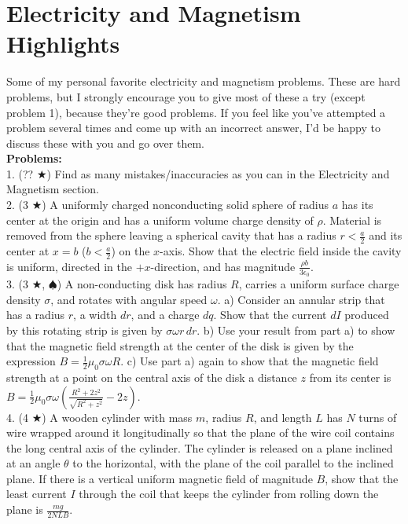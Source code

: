 \section*{Electricity and Magnetism Highlights}
Some of my personal favorite electricity and magnetism problems. These are hard problems, but I strongly encourage you to give most of these a try (except problem 1), because they're good problems. If you feel like you've attempted a problem several times and come up with an incorrect answer, I'd be happy to discuss these with you and go over them.\\
\textbf{Problems:}\\
1. (?? $\bigstar$) Find as many mistakes/inaccuracies as you can in the Electricity and Magnetism section. \\
2. (3 $\bigstar$) A uniformly charged nonconducting solid sphere of radius $a$ has its center at the origin and has a uniform volume charge density of $\rho$. Material is removed from the sphere leaving a spherical cavity that has a radius $r < \frac{a}{2}$ and its center at $x=b$ ($b< \frac{a}{2}$) on the $x$-axis. Show that the electric field inside the cavity is uniform, directed in the $+x$-direction, and has magnitude $\frac{\rho b}{3\epsilon_0}$. \\
3. (3 $\bigstar$, $\spadesuit$) A non-conducting disk has radius $R$, carries a uniform surface charge density $\sigma$, and rotates with angular speed $\omega$. a) Consider an annular strip that has a radius $r$, a width $dr$, and a charge $dq$. Show that the current $dI$ produced by this rotating strip is given by $\sigma \omega r\, dr$. b) Use your result from part a) to show that the magnetic field strength at the center of the disk is given by the expression $B = \frac{1}{2} \mu_0 \sigma \omega R$. c) Use part a) again to show that the magnetic field strength at a point on the central axis of the disk a distance $z$ from its center is $B = \frac{1}{2} \mu_0 \sigma \omega \left(\frac{R^2 + 2z^2}{\sqrt{R^2 + z^2}} - 2z\right)$.\\
4. (4 $\bigstar$) A wooden cylinder with mass $m$, radius $R$, and length $L$ has $N$ turns of wire wrapped around it longitudinally so that the plane of the wire coil contains the long central axis of the cylinder. The cylinder is released on a plane inclined at an angle $\theta$ to the horizontal, with the plane of the coil parallel to the inclined plane. If there is a vertical uniform magnetic field of magnitude $B$, show that the least current $I$ through the coil that keeps the cylinder from rolling down the plane is $\frac{mg}{2NLB}$.\\
